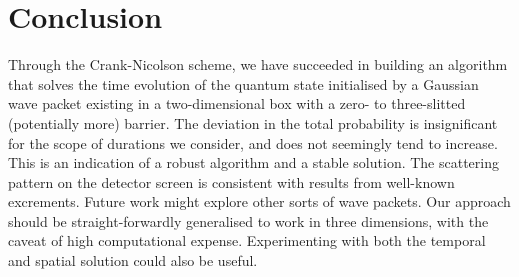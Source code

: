 \section{Conclusion}\label{sec:conclusion}

Through the Crank-Nicolson scheme, we have succeeded in building an algorithm that solves the time evolution of the quantum state initialised by a Gaussian wave packet existing in a two-dimensional box with a zero- to three-slitted (potentially more) barrier. The deviation in the total probability is insignificant for the scope of durations we consider, and does not seemingly tend to increase. This is an indication of a robust algorithm and a stable solution. The scattering pattern on the detector screen is consistent with results from well-known excrements. Future work might explore other sorts of wave packets. Our approach should be straight-forwardly generalised to work in three dimensions, with the caveat of high computational expense. Experimenting with both the temporal and spatial solution could also be useful.



